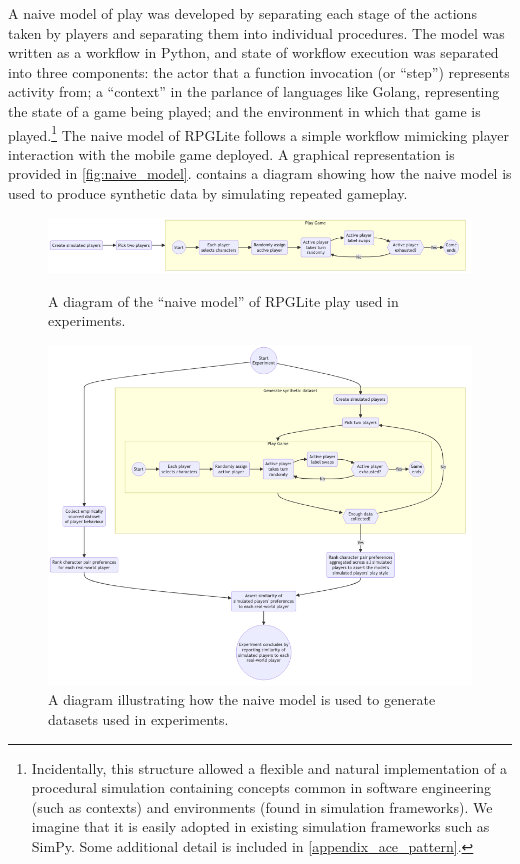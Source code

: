 A naive model of play was developed by separating each stage of the actions
taken by players and separating them into individual procedures. The model was
written as a workflow in Python, and state of workflow execution was separated
into three components: the actor that a function invocation (or ``step'')
represents activity from; a ``context'' in the parlance of languages like
Golang, representing the state of a game being played; and the environment in
which that game is played.\footnote{Incidentally, this structure allowed a
flexible and natural implementation of a procedural simulation containing
concepts common in software engineering (such as contexts) and environments
(found in simulation frameworks). We imagine that it is easily adopted in
existing simulation frameworks such as SimPy\cite{simpy_intro}. Some additional
detail is included in \cref{appendix_ace_pattern}.} The naive model of RPGLite
follows a simple workflow mimicking player interaction with the mobile game
deployed. A graphical representation is provided in \cref{fig:naive_model}.
 contains a diagram showing
how the naive model is used to produce synthetic data by simulating repeated
gameplay.

\begin{figure}[tp]
  \centering
  \includegraphics[width=\columnwidth]{60_optimisation_with_aspects/diagrams/naive_model.png}
  \caption{A diagram of the ``naive model'' of RPGLite play used in experiments.}
  \label{fig:naive_model}

  \includegraphics[width=\columnwidth]{60_optimisation_with_aspects/diagrams/experiment_setup_for_datagen.png}
  \caption{A diagram illustrating how the naive model is used to generate datasets used in experiments.}
  \label{fig:naive_model_with_experimental_apparatus}
\end{figure}


